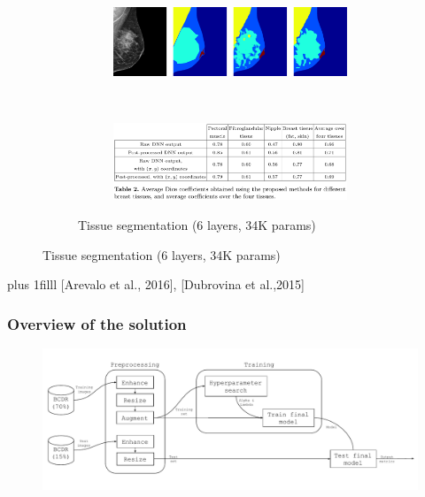 \documentclass{beamer}
\newcommand{\source}[1]{\vskip0pt plus 1filll \scriptsize #1}
\begin{document}
\begin{frame}
\begin{figure}[h]
\begin{subfigure}{0.48\textwidth}
\begin{subfigure}{\textwidth}
				\end{subfigure}
				~
				\begin{subfigure}{\textwidth}
					\includegraphics[width=\textwidth]{plots/dubrovina2.png}
				\end{subfigure}
				~
				\begin{subfigure}{\textwidth}
					\includegraphics[width=\textwidth]{plots/dubrovinaResults.png}
				\end{subfigure}
				\caption{Tissue segmentation (6 layers, 34K params)}
			\end{subfigure}
		\end{figure}
		\source{[Arevalo et al., 2016], [Dubrovina et al.,2015]}
	\end{frame}
	
	\begin{frame}
		\frametitle{Overview of the solution}
		\begin{figure}[ht]
			\centering
			\includegraphics[width=\textwidth]{plots/overview.pdf}
		\end{figure}
	\end{frame}
	
\end{document}
